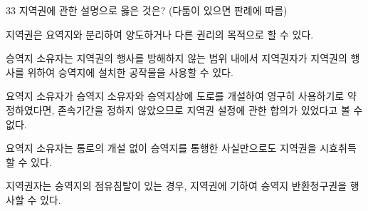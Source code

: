\begin{question}{33}
지역권에 관한 설명으로 옳은 것은? (다툼이 있으면 판례에 따름)
\begin{choices}
  \item 지역권은 요역지와 분리하여 양도하거나 다른 권리의 목적으로 할 수 있다.
  \item 승역지 소유자는 지역권의 행사를 방해하지 않는 범위 내에서 지역권자가 지역권의 행사를 위하여 승역지에 설치한 공작물을 사용할 수 있다.
  \item 요역지 소유자가 승역지 소유자와 승역지상에 도로를 개설하여 영구히 사용하기로 약정하였다면, 존속기간을 정하지 않았으므로 지역권 설정에 관한 합의가 있었다고 볼 수 없다.
  \item 요역지 소유자는 통로의 개설 없이 승역지를 통행한 사실만으로도 지역권을 시효취득할 수 있다.
  \item 지역권자는 승역지의 점유침탈이 있는 경우, 지역권에 기하여 승역지 반환청구권을 행사할 수 있다.
\end{choices}
\end{question}
